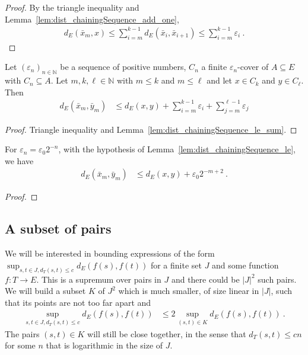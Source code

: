 \begin{proof}\leanok
By the triangle inequality and Lemma~\ref{lem:dist_chainingSequence_add_one},
\begin{align*}
  d_E(\bar{x}_m, x)
  \le \sum_{i=m}^{k-1} d_E(\bar{x}_i, \bar{x}_{i+1})
  \le \sum_{i=m}^{k-1} \varepsilon_i
  \: .
\end{align*}
\end{proof}


\begin{lemma}\label{lem:dist_chainingSequence_le}
  \leanok
Let $(\varepsilon_n)_{n \in \mathbb{N}}$ be a sequence of positive numbers, $C_n$ a finite $\varepsilon_n$-cover of $A \subseteq E$ with $C_n \subseteq A$.
Let $m, k, \ell \in \mathbb{N}$ with $m \le k$ and $m \le \ell$ and let $x \in C_k$ and $y \in C_\ell$.
Then
\begin{align*}
  d_E(\bar{x}_m, \bar{y}_m)
  &\le d_E(x, y) + \sum_{i=m}^{k-1} \varepsilon_i + \sum_{j=m}^{\ell-1} \varepsilon_j
\end{align*}
\end{lemma}

\begin{proof}\leanok
Triangle inequality and Lemma~\ref{lem:dist_chainingSequence_le_sum}.
\end{proof}


\begin{corollary}\label{cor:dist_chainingSequence_pow_two_le}
  \leanok
For $\varepsilon_n = \varepsilon_0 2^{-n}$, with the hypothesis of Lemma~\ref{lem:dist_chainingSequence_le}, we have
\begin{align*}
  d_E(\bar{x}_m, \bar{y}_m)
  &\le d_E(x, y) + \varepsilon_0 2^{-m+2}
  \: .
\end{align*}
\end{corollary}

\begin{proof}\leanok

\end{proof}


\subsection{A subset of pairs}

We will be interested in bounding expressions of the form $\sup_{s,t\in J, d_T(s,t) \le c} d_E(f(s), f(t))$ for a finite set $J$ and some function $f : T \to E$.
This is a supremum over pairs in $J$ and there could be $\vert J \vert^2$ such pairs.
We will build a subset $K$ of $J^2$ which is much smaller, of size linear in $\vert J \vert$, such that its points are not too far apart and
\begin{align*}
  \sup_{s,t\in J, d_T(s,t) \le c} d_E(f(s), f(t))
  & \le 2 \sup_{(s,t) \in K} d_E(f(s), f(t))
  \: .
\end{align*}
The pairs $(s, t) \in K$ will still be close together, in the sense that $d_T(s, t) \le c n$ for some $n$ that is logarithmic in the size of $J$.

